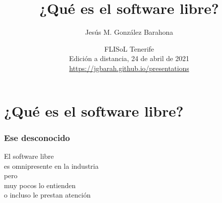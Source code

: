 \documentclass[17pt,aspectratio=169]{beamer}
\begin{document}
\title{¿Qué es el software libre?}
\author{Jesús M. González Barahona}

\date{FLISoL Tenerife \\
  Edición a distancia, 24 de abril de 2021\\
{\small \url{https://jgbarah.github.io/presentations}} \\}

\frame{
\maketitle
}




\section{¿Qué es el software libre?}


\begin{frame}
\frametitle{Ese desconocido}

\begin{center}
  {\Large
  El software libre \\
  es omnipresente en la industria \\
  pero \\
  muy pocos lo entienden \\
  o incluso le prestan atención \\
  }
\end{center}

\end{frame}

\end{document}
